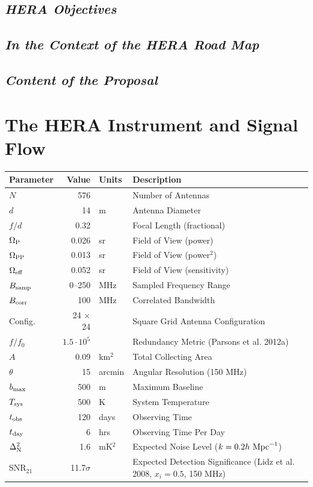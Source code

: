 \documentclass[preprint]{aastex}
\begin{document}
\subsection{\it{HERA Objectives}}

\subsection{\it{In the Context of the HERA Road Map}}

\subsection{\it{Content of the Proposal}}

\section{The HERA Instrument and Signal Flow}


\begin{table}
\label{tab:params}
\begin{tabular}{|l|rl|l|}
\hline
Parameter & Value & Units & Description \\
\hline
$N$  &  576  & & Number of Antennas \\
$d$ & 14 & m & Antenna Diameter \\
$f/d$ & 0.32 &  & Focal Length (fractional) \\
$\Omega_{\rm P}$ & 0.026 & sr & Field of View (power) \\
$\Omega_{\rm PP}$ & 0.013 & sr & Field of View (power$^2$) \\
$\Omega_{\rm eff}$ & 0.052 & sr & Field of View (sensitivity) \\
$B_{\rm samp}$ & 0--250 & MHz & Sampled Frequency Range \\
$B_{\rm corr}$ & 100 & MHz & Correlated Bandwidth \\
Config.	& 24 $\times$ 24 & & Square Grid Antenna Configuration\\
$f/f_0$ & $1.5\cdot10^5$ & & Redundancy Metric (Parsons et al. 2012a) \\
$A$ & 0.09 & km$^2$ & Total Collecting Area \\
$\theta$ & 15 & arcmin & Angular Resolution (150 MHz) \\
$b_{\rm max}$ & 500 & m & Maximum Baseline \\
$T_{\rm sys}$ & 500 & K & System Temperature \\
$t_{\rm obs}$ & 120 & days & Observing Time \\
$t_{\rm day}$ & 6 & hrs & Observing Time Per Day\\
$\Delta_{\rm N}^2$ & 1.6 & mK$^2$ & Expected Noise Level ($k=0.2 h\ {\rm Mpc}^{-1}$) \\
SNR$_{21}$ & 11.7$\sigma$ &  & Expected Detection Significance (Lidz et al. 2008, $x_i=0.5$, 150 MHz) \\
\hline
\end{tabular}
\end{table}
\end{document}
